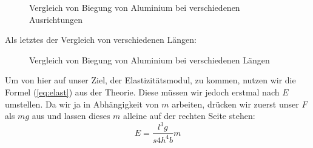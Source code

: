 \documentclass[11pt,a4paper]{article}
\begin{document}
\begin{figure}[h]
\centering
{}
\renewcommand\thefigure{D2}
\caption[Vergleich von Biegung von Aluminium bei verschiedenen Ausrichtungen]{Vergleich von Biegung von Aluminium bei verschiedenen Ausrichtungen}
\label{Abb:2}
\end{figure}

\pagebreak

Als letztes der Vergleich von verschiedenen L\"angen:
\begin{figure}[h]
\centering
{}
\renewcommand\thefigure{D3}
\caption[Vergleich von Biegung von Aluminium bei verschiedenen L\"angen]{Vergleich von Biegung von Aluminium bei verschiedenen L\"angen}
\label{Abb:3}
\end{figure}

\pagebreak

Um von hier auf unser Ziel, der Elastizit\"atsmodul, zu kommen, nutzen wir die Formel (\ref{eq:elast}) aus der Theorie. Diese m\"ussen wir jedoch erstmal nach $E$ umstellen. Da wir ja in Abh\"angigkeit von $m$ arbeiten, dr\"ucken wir zuerst unser $F$ als $mg$ aus und lassen dieses $m$ alleine auf der rechten Seite stehen:
\[
E=\frac{l^3g}{s4h^4b}m
\]
\end{document}
